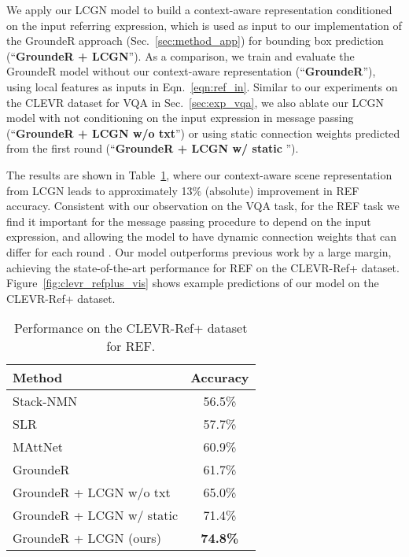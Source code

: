 \documentclass[10pt,twocolumn,letterpaper]{article}
\begin{document}
We apply our LCGN model to build a context-aware representation  conditioned on the input referring expression, which is used as input to our implementation of the GroundeR approach \cite{rohrbach2016grounding} (Sec.~\ref{sec:method_app}) for bounding box prediction (``\textbf{GroundeR + LCGN}''). As a comparison, we train and evaluate the GroundeR model without our context-aware representation (``\textbf{GroundeR}''), using local features  as inputs in Eqn.~\ref{eqn:ref_in}. Similar to our experiments on the CLEVR dataset for VQA in Sec.~\ref{sec:exp_vqa}, we also ablate our LCGN model with not conditioning on the input expression in message passing (``\textbf{GroundeR + LCGN w/o txt}'') or using static connection weights  predicted from the first round (``\textbf{GroundeR + LCGN w/ static }''). 

The results are shown in Table~\ref{tab:clevr_refplus}, where our context-aware scene representation from LCGN leads to approximately 13\% (absolute) improvement in REF accuracy. Consistent with our observation on the VQA task, for the REF task we find it important for the message passing procedure to depend on the input expression, and allowing the model to have dynamic connection weights  that can differ for each round . Our model outperforms previous work by a large margin, achieving the state-of-the-art performance for REF on the CLEVR-Ref+ dataset. Figure~\ref{fig:clevr_refplus_vis} shows example predictions of our model on the CLEVR-Ref+ dataset. 

\begin{table}[t]
\small
\vspace{-1.5em}
\begin{center}
\begin{tabular}{lc}
\toprule
Method & Accuracy \\
\midrule
Stack-NMN \cite{hu2018explainable} & 56.5\% \\
SLR \cite{yu2017joint} & 57.7\% \\
MAttNet \cite{yu2018mattnet} & 60.9\% \\
\midrule
GroundeR \cite{rohrbach2016grounding} & 61.7\% \\
GroundeR + LCGN w/o txt & 65.0\% \\
GroundeR + LCGN w/ static  & 71.4\% \\
GroundeR + LCGN (ours) & \textbf{74.8\%} \\
\bottomrule
\end{tabular}
\vspace{-0.7em}
\end{center}
\caption{Performance on the CLEVR-Ref+ dataset for REF.}
\label{tab:clevr_refplus}
\vspace{-1.5em}
\end{table}
\end{document}
